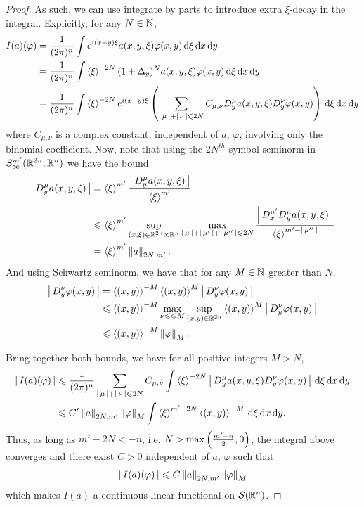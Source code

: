 \documentclass[12pt]{article}
\begin{document}
\begin{proof}
    As such,  we can use integrate by parts to introduce extra $\xi$-decay in the integral. Explicitly, for any $N \in \N$, 
    \begin{align*}
        I(a)(\varphi) 
        & = \frac{1}{(2\pi)^n} \int e^{i(x- y)\xi} a(x, y, \xi) \varphi(x, y) \d[\xi] \d[x] \d[y]\\
        & = \frac{1}{(2\pi)^n} \int \sym[\xi]^{-2N} (1 + \Delta_y)^N a(x, y, \xi) \varphi(x, y) \d[\xi] \d[x] \d[y]\\
        &=  \frac{1}{(2\pi)^n} \int \sym[\xi]^{-2N} e^{i (x - y) \xi } \brac{ \sum_{\abs{\mu} + \abs{\nu} \leq 2N} C_{\mu, \nu}  D^\mu_y a(x, y, \xi) D^\nu_{y} \varphi(x, y)} \d[\xi] \d[x] \d[y]\\
    \end{align*}
    where $C_{\mu, \nu}$ is a complex constant, independent of $a$, $\varphi$, involving only the binomial coefficient. Now, note that using the $2N^{th}$ symbol seminorm in $S^{m'}_{\infty}(\R^{2n}; \R^{n})$ we have the bound
    \begin{align*}
    \abs{D^\mu_y a(x, y, \xi)} 
    &= \sym[\xi]^{m' } \frac{\abs{D^\mu_y a(x, y, \xi)}}{\sym[\xi]^{m'}} \\
    & \leq \sym[\xi]^{m'} \sup_{(x, \xi) \in \R^{2n} \times \R^n} \max_{\abs{\mu} + \abs{\mu'} + \abs{\mu''} \leq 2N} \frac{\abs{D^{\mu'}_x D^\mu_y a(x, y, \xi)}}{\sym[\xi]^{m' - \abs{\mu''}}} \\
    & = \sym[\xi]^{m'} \norm[a]_{2N,m'}. 
    \end{align*}
    And using Schwartz seminorm, we have that for any $M \in \N$ greater than $N$,  
    \begin{align*}
    \abs{D^\nu_y \varphi(x, y)} 
    &= \sym[(x, y)]^{- M} \sym[(x, y)]^{M} \abs{D^{\nu}_{y} \varphi(x,y)} \\
    & \leq  \sym[(x, y)]^{- M} \max_{\nu{\leq} \leq M} \sup_{(x, y) \in \R^{2n}} \sym[(x, y)]^{M} \abs{D^{\nu}_{y} \varphi(x,y)}\\
    & \leq \sym[(x, y)]^{-M} \norm[\varphi]_{M}. 
    \end{align*}

    Bring together both bounds, we have for all positive integers $M > N$, 
    \begin{align*}
        \abs{I(a)(\varphi)} 
        & \leq  \frac{1}{(2\pi)^n} \sum_{\abs{\mu} + \abs{\nu} \leq 2N} C_{\mu, \nu}  \int \sym[\xi]^{-2N} \abs{ D^\mu_y a(x, y, \xi) D^\nu_{y} \varphi(x, y)} \d[\xi] \d[x] \d[y]\\
        & \leq  C' \norm[a]_{2N,m'} \norm[\varphi]_{M}  \int \sym[\xi]^{m ' -2N} \sym[(x, y)]^{-M}  \d[\xi] \d[x] \d[y]. \\
    \end{align*}
    Thus, as long as $m' - 2N < -n$, i.e. $N > \max\brac{\frac{m' + n}{2}, 0}$, the integral above converges and there exist $C > 0$ independent of $a$, $\varphi$ such that   
    \begin{align*}
        \abs{I(a)(\varphi)} \leq C \norm[a]_{2N, m'}\norm[\varphi]_{M} 
    \end{align*}
    which makes $I(a)$ a continuous linear functional on $\sch(\R^n)$. 
    
\end{proof}
\end{document}
